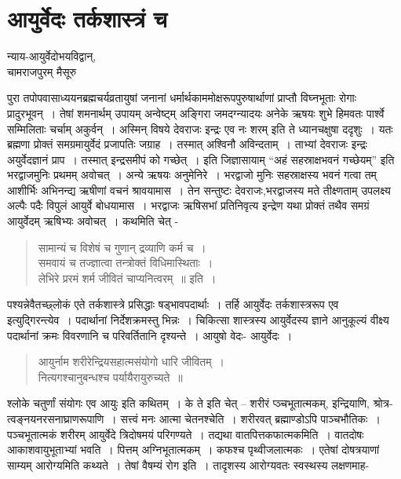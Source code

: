 {\fontsize{15}{17}\selectfont
\presetvalues
\chapter{आयुर्वेदः तर्कशास्त्रं च}

\begin{center}
\smallskip

न्याय-आयुर्वेदोभयविद्वान्,\\
चामराजपुरम् मैसूरु
\addrule
\end{center}

पुरा तपोपवासाध्ययनब्रह्मचर्यव्रतायुषां जनानां धर्मार्थकाममोक्षरूपपुरुषार्थाणां प्राप्तौ विघ्नभूताः रोगाः प्रादुरभूवन्~। तेषां शमनार्थम् उपायम् अन्वेष्ट्म् अङ्गिरा जमदग्न्यादयः अनेके ऋषयः शुभे हिमवतः पार्श्वे सम्मिलिताः चर्चाम् अकुर्वन्~। अस्मिन् विषये देवराजः इन्द्रः एव नः शरम् इति ते ध्यानचक्षुषा ददृशुः~। यतः ब्रह्मणा प्रोक्तं समग्रमायुर्वेदं प्रजापतिः जग्राह~। तस्मात् अश्विनौ अविन्दताम्~। ताभ्यां देवराजः इन्द्रः अयुर्वेदज्ञानं प्राप~। तस्मात् इन्द्रसमीपं को गच्छेत्~। इति जिज्ञासायाम् “अहं सहस्राक्षभवनं गच्छेयम्” इति भरद्वाजमुनिः प्रथमम् अवोचत्~। अन्ये ऋषयः अनुमेनिरे~। भरद्वाजो मुनिः सहस्राक्षस्य भवनं गत्वा तम् आशीर्भिः अभिनन्द्य ऋषीणां वचनं श्रावयामास~। तेन सन्तुष्टः देवराजः,भरद्वाजस्य मते तीक्ष्णताम् उपलक्ष्य अल्पैः पदैः विपुलं आयुर्वे बोधयामास~। भरद्वाजः ऋषिसभां प्रतिनिवृत्य इन्द्रेण यथा प्रोक्तं तथैव समग्रं आयुर्वेदम् ऋषिभ्यः अवोचत्~। कथमिति चेत् -
\begin{verse}
सामान्यं च विशेषं च गुणान् द्रव्याणि कर्म च~। \\
समवायं च तज्ज्ञात्वा तन्त्रोक्तं विधिमास्थिताः~। \\
लेभिरे प्ररमं शर्म जीवितं चाप्यनित्वरम्~॥ इति~। 
\end{verse}
पश्यन्नेवैतच्छ्लोकं एते तर्कशास्त्रे प्रसिद्धाः षड्भावपदार्थाः~। तर्हि आयुर्वेदः तर्कशास्त्ररूप एव इत्युद्गिरन्त्येव~। पदार्थानां निर्देशक्रमस्तु भिन्नः~। चिकित्सा शास्त्रस्य आयुर्वेदस्य ज्ञाने आनुकूल्यं वीक्ष्य पदार्थानां क्रमः विवरणानि च परिवर्तितानि दृश्यन्ते~। आयुषो वेदः- आयुर्वेदः~। 
\begin{verse}
आयुर्नाम शरीरेन्द्रियसहात्मसंयोगो धारि जीवितम्~। \\
नित्यगश्चानुबन्धश्च पर्यायैरायुरुच्यते~॥
\end{verse}
श्लोके चतुर्णां संयोगः एव आयुः इति कथितम्~। के ते इति चेत् – शरीरं प्ञ्चभूतात्मकम्, इन्द्रियाणि, श्रोत्र-त्वङ्नयनरसनाघ्राणरूपाणि~। सत्त्वं मनः आत्मा चेतनश्चेति~। शरीरवत् ब्रह्माण्डोऽपि पाञ्चभौतिकः~। पञ्चभूतात्मकं शरीरम् आयुर्वेदे त्रिदोषमयं परिगण्यते~। तद्यथा वातपित्तकफात्मकमिति~। वातदोषः आकाशवायुभूताभ्यां भवति~। पित्तम् अग्निभूतात्मकम्~। कफश्च पृथ्वीजलात्मकः~। एतेषां दोषत्रयाणां साम्यम् आरोग्यमिति कथ्यते~। तेषां वैषम्यं रोग इति~। तादृशस्य आरोग्यवतः स्वस्थस्य लक्षणमाह-
}
